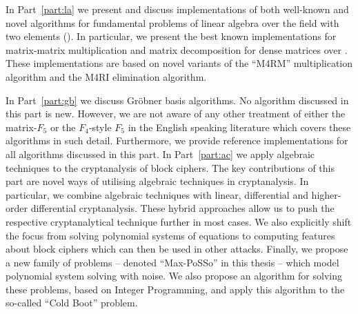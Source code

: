 In Part~\ref{part:la} we present and discuss implementations of both well-known and novel algorithms for fundamental problems of linear algebra over the field with two elements (\GFZ). In particular, we present the best known implementations for matrix-matrix multiplication and matrix decomposition for dense matrices over \GFZ. These implementations are based on novel variants of the ``M4RM'' multiplication algorithm and the M4RI elimination algorithm.

In Part~\ref{part:gb} we discuss Gröbner basis algorithms. No algorithm discussed in this part is new. However, we are not aware of any other treatment of either the matrix-$F_5$ or the $F_4$-style $F_5$ in the English speaking literature which covers these algorithms in such detail. Furthermore, we provide reference implementations for all algorithms discussed in this part. 
In Part~\ref{part:ac} we apply algebraic techniques to the cryptanalysis of block ciphers. The key contributions of this part are novel ways of utilising algebraic techniques in cryptanalysis. In particular, we combine algebraic techniques with linear, differential and higher-order differential cryptanalysis. These hybrid approaches allow us to push the respective cryptanalytical technique further in most cases. We also explicitly shift the focus from solving polynomial systems of equations to computing features about block ciphers which can then be used in other attacks. Finally, we propose a new family of problems -- denoted ``Max-PoSSo'' in this thesis -- which model polynomial system solving with noise. We also propose an algorithm for solving these problems, based on Integer Programming, and apply this algorithm to the so-called ``Cold Boot'' problem.
